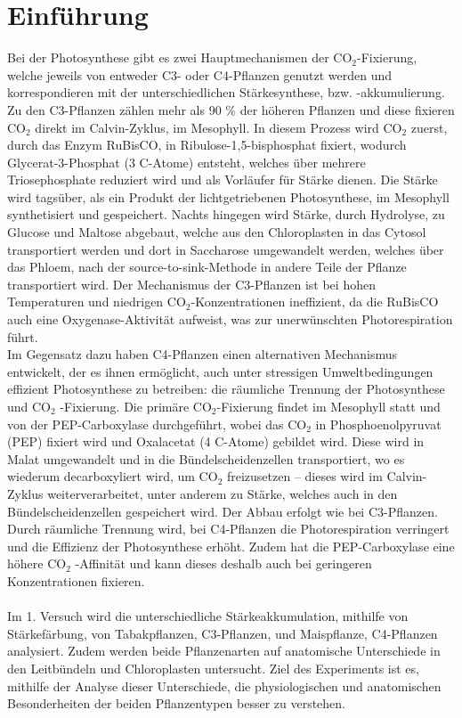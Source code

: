 \documentclass[10pt,a4paper]{article}
\begin{document}
	\section{Einführung}	
		Bei der Photosynthese gibt es zwei Hauptmechanismen der CO$_2$-Fixierung, welche jeweils von entweder C3- oder C4-Pflanzen genutzt werden und korrespondieren mit der unterschiedlichen Stärkesynthese, bzw. -akkumulierung.
		Zu den C3-Pflanzen zählen mehr als 90 $\%$ der höheren Pflanzen und diese fixieren CO$_2$ direkt im Calvin-Zyklus, im Mesophyll. In diesem Prozess wird CO$_2$  zuerst, durch das Enzym RuBisCO, in Ribulose-1,5-bisphosphat fixiert, wodurch Glycerat-3-Phosphat (3 C-Atome) entsteht, welches über mehrere Triosephosphate reduziert wird und als Vorläufer für Stärke dienen. Die Stärke wird tagsüber, als ein Produkt der lichtgetriebenen Photosynthese, im Mesophyll synthetisiert und gespeichert. Nachts hingegen wird Stärke, durch Hydrolyse, zu Glucose und Maltose abgebaut, welche aus den Chloroplasten in das Cytosol transportiert werden und dort in Saccharose umgewandelt werden, welches über das Phloem, nach der source-to-sink-Methode in andere Teile der Pflanze transportiert wird. Der Mechanismus der C3-Pflanzen ist bei hohen Temperaturen und niedrigen CO$_2$-Konzentrationen ineffizient, da die RuBisCO auch eine Oxygenase-Aktivität aufweist, was zur unerwünschten Photorespiration führt. \\
		Im Gegensatz dazu haben C4-Pflanzen einen alternativen Mechanismus entwickelt, der es ihnen ermöglicht, auch unter stressigen Umweltbedingungen effizient Photosynthese zu betreiben: die räumliche Trennung der Photosynthese und CO$_2$ -Fixierung. Die primäre CO$_2$-Fixierung findet im Mesophyll statt und von der PEP-Carboxylase durchgeführt, wobei das CO$_2$  in Phosphoenolpyruvat (PEP) fixiert wird und Oxalacetat (4 C-Atome) gebildet wird. Diese wird in Malat umgewandelt und in die Bündelscheidenzellen transportiert, wo es wiederum decarboxyliert wird, um CO$_2$ freizusetzen – dieses wird im Calvin-Zyklus weiterverarbeitet, unter anderem zu Stärke, welches auch in den Bündelscheidenzellen gespeichert wird. Der Abbau erfolgt wie bei C3-Pflanzen. Durch räumliche Trennung wird, bei C4-Pflanzen die Photorespiration verringert und die Effizienz der Photosynthese erhöht. Zudem hat die PEP-Carboxylase eine höhere CO$_2$ -Affinität und kann dieses deshalb auch bei geringeren Konzentrationen fixieren. \\
		\\
		Im 1. Versuch wird die unterschiedliche Stärkeakkumulation, mithilfe von Stärkefärbung, von Tabakpflanzen, C3-Pflanzen, und Maispflanze, C4-Pflanzen analysiert. Zudem werden beide Pflanzenarten auf anatomische Unterschiede in den Leitbündeln und Chloroplasten untersucht. Ziel des Experiments ist es, mithilfe der Analyse dieser Unterschiede, die physiologischen und anatomischen Besonderheiten der beiden Pflanzentypen besser zu verstehen. \\
\end{document}

